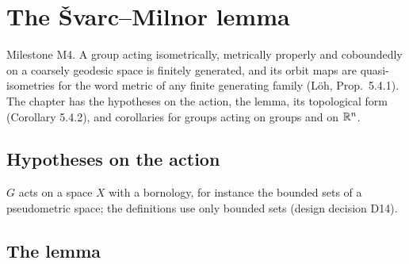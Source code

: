\chapter{The \v{S}varc--Milnor lemma}
\label{chap:svarc-milnor}

Milestone M4. A group acting isometrically, metrically properly and coboundedly on a coarsely
geodesic space is finitely generated, and its orbit maps are quasi-isometries for the word metric
of any finite generating family (L\"oh, Prop.~5.4.1). The chapter has the hypotheses on the
action, the lemma, its topological form (Corollary 5.4.2), and corollaries for groups acting on
groups and on $\mathbb{R}^n$.

\section{Hypotheses on the action}

$G$ acts on a space $X$ with a bornology, for instance the bounded sets of a pseudometric space;
the definitions use only bounded sets (design decision D14).








\section{The lemma}

